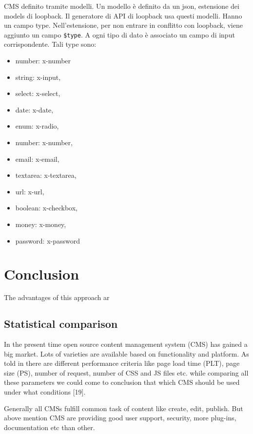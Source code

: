 \documentclass{sig-alternate}
\begin{document}
CMS definito tramite modelli. Un modello è definito da un json, estensione dei models di loopback. Il generatore di API di loopback usa questi modelli. Hanno un campo type. Nell'estensione, per non entrare in conflitto con loopback, viene aggiunto un campo {\tt \$type}.
A ogni tipo di dato è associato un campo di input corrispondente. 
Tali type sono: 

\begin{itemize}
\itemsep1pt\parskip0pt
       \item number: x-number
       \item string: x-input,
       \item select: x-select,
       \item date: x-date,
       \item enum: x-radio,
       \item number: x-number,
       \item email: x-email,
       \item textarea: x-textarea,
       \item url: x-url,
       \item boolean: x-checkbox,
       \item money: x-money,
       \item password: x-password
\end{itemize}


\section{Conclusion}

The advantages of this approach ar

\subsection{Statistical comparison}

In the present time open source content management system (CMS) has gained a big market. Lots of varieties are available based on functionality and platform.
As told in there are different performance criteria like page load time (PLT), page size (PS), number of request, number of CSS and JS files etc. while comparing all these parameters we could come to conclusion that which CMS should be used under what conditions [19].

Generally all CMSs fulfill common task of content like create, edit, publish. But above mention CMS are providing good user support, security, more plug-ins, documentation etc than other.
 
\end{document}
